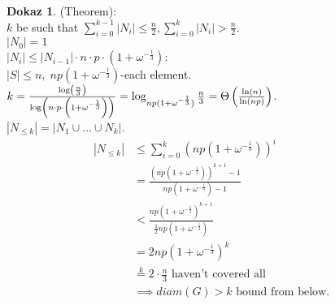 \documentclass[a4paper, 12pt]{book}
\theoremstyle{definition}
\newtheorem{pro}[counter]{Dokaz}
\theoremstyle{remark}
\begin{document}
\begin{pro}(Theorem): \\
  $k$ be such that $\sum_{i=0}^{k-1} |N_i| \leq \frac{n}{2}, \sum_{i=0}^{k} |N_i| > \frac{n}{2}$. \\
  $|N_0| = 1$ \\
  $|N_i| \leq |N_{i-1}| \cdot n \cdot p \cdot (1+\omega^{-\frac{1}{3}})$: \\
  $|S| \leq n, \; np(1+\omega^{-\frac{1}{3}})$-each element. \\
  $k = \frac{\log \left(\frac{n}{3}\right)}{\log \left(n \cdot p \cdot \left(1+\omega^{-\frac{1}{3}}\right)\right)} \\
  = \log_{np(1+\omega^{-\frac{1}{3}})} \frac{n}{3} = \Theta\left(\frac{\ln(n)}{\ln(np)}\right)$. \\
  $|N_{\leq k}| = |N_1 \cup \dots \cup N_k|$.
  \begin{align*}
    |N_{\leq k}| &\leq \sum_{i=0}^{k} (np(1+\omega^{-\frac{1}{3}}))^i \\
    &= \frac{(np(1+\omega^{-\frac{1}{3}}))^{k+1}-1}{np(1+\omega^{-\frac{1}{3}}) - 1} \\
    &< \frac{np(1+\omega^{-\frac{1}{3}})^{k+1}}{\frac{1}{2} np(1+\omega^{-\frac{1}{3}})} \\
    &= 2 np(1+\omega^{-\frac{1}{3}})^k \\
    &\stackrel{k}{=} 2 \cdot \frac{n}{3} \text{ haven't covered all} \\
    &\implies diam(G) > k \text{ bound from below}.
  \end{align*}
\end{pro}



%
%



\end{document}
